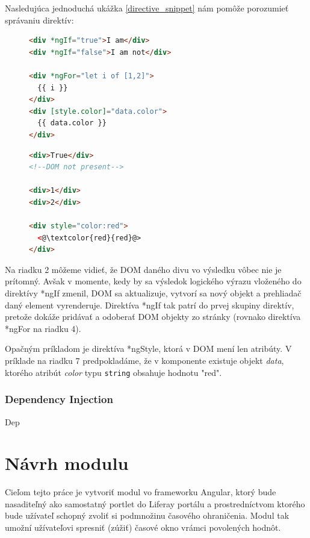 \documentclass[
  digital, %
  twoside, %
  notable,   %
  nolof,   %
  nolot,   %
]{fithesis3}
\begin{document}
Nasledujúca jednoduchá ukážka \ref{directive_snippet} nám pomôže porozumieť správaniu direktív:
\begin{figure}[H]
 \centering
 \begin{minipage}{.59\textwidth}

  \centering
  \begin{lstlisting}[language=HTML,caption={Direktívy použité v template (vľavo) a ako ich vo výsledku vníma prehliadač (vpravo)},label=directive_snippet]
<div *ngIf="true">I am</div>
<div *ngIf="false">I am not</div>

<div *ngFor="let i of [1,2]">
  {{ i }}
</div>
<div [style.color]="data.color">
  {{ data.color }}
</div>
  \end{lstlisting}

 \end{minipage}
 \begin{minipage}{.39\textwidth}

  \centering
  \begin{lstlisting}[language=HTML,numbers=none,xleftmargin=0em]
<div>True</div>
<!--DOM not present-->

<div>1</div>
<div>2</div>

<div style="color:red">
  <@\textcolor{red}{red}@>
</div>
  \end{lstlisting}
 
 \end{minipage}
\end{figure}

Na riadku 2 môžeme vidieť, že DOM daného divu vo výsledku vôbec nie je prítomný. Avšak v momente, kedy by sa výsledok logického výrazu vloženého do direktívy *ngIf zmenil, DOM sa aktualizuje, vytvorí sa nový objekt a prehliadač daný element vyrenderuje. Direktíva *ngIf tak patrí do prvej skupiny direktív, pretože dokáže pridávať a odoberať DOM objekty zo stránky (rovnako direktíva *ngFor na riadku 4).

Opačným príkladom je direktíva *ngStyle, ktorá v DOM mení len atribúty. V príklade na riadku 7 predpokladáme, že v komponente existuje objekt \textit{data}, ktorého atribút \textit{color} typu \texttt{string} obsahuje hodnotu "red".

\subsection{Dependency Injection}
Dep

\chapter{Návrh modulu}
Cieľom tejto práce je vytvoriť modul vo frameworku Angular, ktorý bude nasaditeľný ako samostatný portlet do Liferay portálu a prostredníctvom ktorého bude užívateľ schopný zvoliť si podmnožinu časového ohraničenia. Modul tak umožní užívateľovi spresniť (zúžiť) časové okno vrámci povolených hodnôt.
\end{document}
